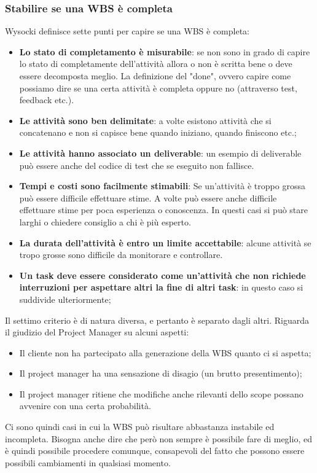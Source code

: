 \subsubsection{Stabilire se una WBS è completa}
Wysocki definisce sette punti per capire se una WBS è completa:
\begin{itemize}
	\item \textbf{Lo stato di completamento è misurabile}: se non sono in grado di capire lo stato di completamente dell'attività allora o non è scritta bene o deve essere decomposta meglio. La definizione del "done", ovvero capire come possiamo dire se una certa attività è completa oppure no (attraverso test, feedback etc.).
	\item \textbf{Le attività sono ben delimitate}: a volte esistono attività che si concatenano e non si capisce bene quando iniziano, quando finiscono etc.;
	\item \textbf{Le attività hanno associato un deliverable}: un esempio di deliverable può essere anche del codice di test che se eseguito non fallisce.
	\item \textbf{Tempi e costi sono facilmente stimabili}: Se un'attività è troppo grossa può essere difficile effettuare stime. A volte può essere anche difficile effettuare stime per poca esperienza o conoscenza. In questi casi si può stare larghi o chiedere consiglio a chi è più esperto.
	\item \textbf{La durata dell'attività è entro un limite accettabile}: alcune attività se tropo grosse sono difficile da monitorare e controllare.
	\item \textbf{Un task deve essere considerato come un'attività che non richiede interruzioni per aspettare altri la fine di altri task}: in questo caso si suddivide ulteriormente;
\end{itemize}

Il settimo criterio è di natura diversa, e pertanto è separato dagli altri. Riguarda il giudizio del Project Manager su alcuni aspetti:
\begin{itemize}
	\item Il cliente non ha partecipato alla generazione della WBS quanto ci si aspetta;
	\item Il project manager ha una sensazione di disagio (un brutto presentimento);
	\item Il project manager ritiene che modifiche anche rilevanti dello scope possano avvenire con una certa probabilità.
\end{itemize}
Ci sono quindi casi in cui la WBS può risultare abbastanza instabile ed incompleta. Bisogna anche dire che però non sempre è possibile fare di meglio, ed è quindi possibile procedere comunque, consapevoli del fatto che possono essere possibili cambiamenti in qualsiasi momento.

